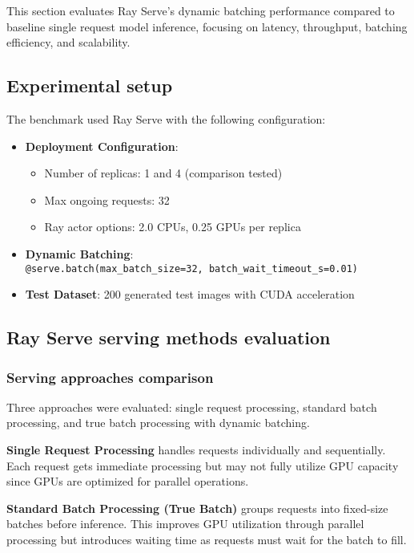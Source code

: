 This section evaluates Ray Serve's dynamic batching performance compared to baseline single request model inference, focusing on latency, throughput, batching efficiency, and scalability.

\subsection{Experimental setup}

The benchmark used Ray Serve with the following configuration:
\begin{itemize}
    \item \textbf{Deployment Configuration}:
    \begin{itemize}
        \item Number of replicas: 1 and 4 (comparison tested)
        \item Max ongoing requests: 32
        \item Ray actor options: 2.0 CPUs, 0.25 GPUs per replica
    \end{itemize}
    \item \textbf{Dynamic Batching}:\\
    \texttt{@serve.batch(max\_batch\_size=32, batch\_wait\_timeout\_s=0.01)}
    \item \textbf{Test Dataset}: 200 generated test images with CUDA acceleration
\end{itemize}

\subsection{Ray Serve serving methods evaluation}

\subsubsection{Serving approaches comparison}

Three approaches were evaluated: single request processing, standard batch processing, and true batch processing with dynamic batching.

\textbf{Single Request Processing} handles requests individually and sequentially. Each request gets immediate processing but may not fully utilize GPU capacity since GPUs are optimized for parallel operations.

\textbf{Standard Batch Processing (True Batch)} groups requests into fixed-size batches before inference. This improves GPU utilization through parallel processing but introduces waiting time as requests must wait for the batch to fill.


